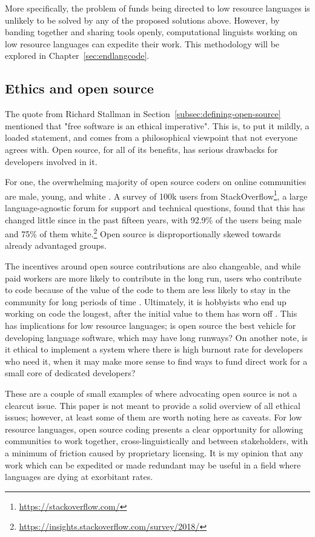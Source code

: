 More specifically, the problem of funds being directed to low resource languages is unlikely to be solved by any of the proposed solutions above. However, by banding together and sharing tools openly, computational linguists working on low resource languages can expedite their work. This methodology will be explored in Chapter~\ref{sec:endlangcode}.

\subsection{Ethics and open source}
\label{subsec:oss-ethics}

The quote from Richard Stallman in Section~\ref{subsec:defining-open-source} mentioned that "free software is an ethical imperative". This is, to put it mildly, a loaded statement, and comes from a philosophical viewpoint that not everyone agrees with. Open source, for all of its benefits, has serious drawbacks for developers involved in it.

For one, the overwhelming majority of open source coders on online communities are male, young, and white \citep{ghosh2002free}. A survey of 100k users from StackOverflow\footnote{\href{https://stackoverflow.com/}{https://stackoverflow.com/}}, a large language-agnostic forum for support and technical questions, found that this has changed little since in the past fifteen years, with 92.9\% of the users being male and 75\% of them white.\footnote{\href{https://insights.stackoverflow.com/survey/2018/}{https://insights.stackoverflow.com/survey/2018/}} Open source is disproportionally skewed towards already advantaged groups.

The incentives around open source contributions are also changeable, and while paid workers are more likely to contribute in the long run, users who contribute to code because of the value of the code to them are less likely to stay in the community for long periods of time \citep{roberts2006understanding, shah2006motivation}. Ultimately, it is hobbyists who end up working on code the longest, after the initial value to them has worn off \citep{shah2006motivation}. This has implications for low resource languages; is open source the best vehicle for developing language software, which may have long runways? On another note, is it ethical to implement a system where there is high burnout rate for developers who need it, when it may make more sense to find ways to fund direct work for a small core of dedicated developers?

These are a couple of small examples of where advocating open source is not a clearcut issue. This paper is not meant to provide a solid overview of all ethical issues; however, at least some of them are worth noting here as caveats. For low resource languages, open source coding presents a clear opportunity for allowing communities to work together, cross-linguistically and between stakeholders, with a minimum of friction caused by proprietary licensing. It is my opinion that any work which can be expedited or made redundant may be useful in a field where languages are dying at exorbitant rates.

